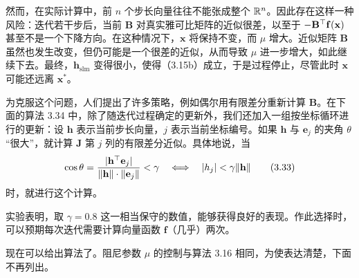然而，在实际计算中，前 $n$ 个步长向量往往不能张成整个 $\mathbb{R}^n$。因此存在这样一种风险：迭代若干步后，当前 $\mathbf B$ 对真实雅可比矩阵的近似很差，以至于 $-\mathbf B^{\top}\mathbf f(\mathbf x)$ 甚至不是一个下降方向。在这种情况下，$\mathbf x$ 将保持不变，而 $\mu$ 增大。近似矩阵 $\mathbf B$ 虽然也发生改变，但仍可能是一个很差的近似，从而导致 $\mu$ 进一步增大，如此继续下去。最终，$\mathbf h_{\mathrm{slm}}$ 变得很小，使得（3.15b）成立，于是过程停止，尽管此时 $\mathbf x$ 可能还远离 $\mathbf x^*$。

为克服这个问题，人们提出了许多策略，例如偶尔用有限差分重新计算 $\mathbf B$。在下面的算法 3.34 中，除了随迭代过程确定的更新外，我们还加入一组按坐标循环进行的更新：设 $\mathbf h$ 表示当前步长向量，$j$ 表示当前坐标编号。如果 $\mathbf h$ 与 $\mathbf e_j$ 的夹角 $\theta$ “很大”，就计算 $\mathbf J$ 第 $j$ 列的有限差分近似。具体地说，当
\begin{equation}
  \cos\theta=\frac{|\mathbf h^{\top}\mathbf e_j|}
    {\lVert\mathbf h\rVert\cdot\lVert\mathbf e_j\rVert}<\gamma
  \quad\Longleftrightarrow\quad |h_j|<\gamma\lVert\mathbf h\rVert
  \tag{3.33}\label{eq:3.33}
\end{equation}
时，就进行这个计算。

实验表明，取 $\gamma=0.8$ 这一相当保守的数值，能够获得良好的表现。作此选择时，可以预期每次迭代需要计算向量函数 $\mathbf f$（几乎）两次。

现在可以给出算法了。阻尼参数 $\mu$ 的控制与算法 3.16 相同，为使表达清楚，下面不再列出。

